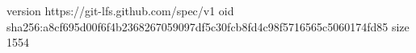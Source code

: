 version https://git-lfs.github.com/spec/v1
oid sha256:a8cf695d00f6f4b2368267059097df5c30fcb8fd4c98f5716565c5060174fd85
size 1554
